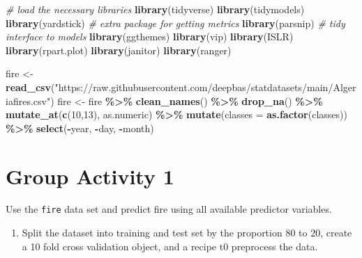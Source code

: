 \documentclass[
]{book}
\newenvironment{Shaded}{\begin{snugshade}}{\end{snugshade}}
\newcommand{\AttributeTok}[1]{\textcolor[rgb]{0.13,0.29,0.53}{#1}}
\newcommand{\CommentTok}[1]{\textcolor[rgb]{0.56,0.35,0.01}{\textit{#1}}}
\newcommand{\DecValTok}[1]{\textcolor[rgb]{0.00,0.00,0.81}{#1}}
\newcommand{\FunctionTok}[1]{\textcolor[rgb]{0.13,0.29,0.53}{\textbf{#1}}}
\newcommand{\NormalTok}[1]{#1}
\newcommand{\OtherTok}[1]{\textcolor[rgb]{0.56,0.35,0.01}{#1}}
\newcommand{\SpecialCharTok}[1]{\textcolor[rgb]{0.81,0.36,0.00}{\textbf{#1}}}
\newcommand{\StringTok}[1]{\textcolor[rgb]{0.31,0.60,0.02}{#1}}
\providecommand{\tightlist}{%
  \setlength{\itemsep}{0pt}\setlength{\parskip}{0pt}}
\begin{document}
\begin{Shaded}
\begin{Highlighting}[]
\CommentTok{\# load the necessary libraries}
\FunctionTok{library}\NormalTok{(tidyverse) }
\FunctionTok{library}\NormalTok{(tidymodels)}
\FunctionTok{library}\NormalTok{(yardstick) }\CommentTok{\# extra package for getting metrics}
\FunctionTok{library}\NormalTok{(parsnip) }\CommentTok{\# tidy interface to models}
\FunctionTok{library}\NormalTok{(ggthemes)}
\FunctionTok{library}\NormalTok{(vip)}
\FunctionTok{library}\NormalTok{(ISLR)}
\FunctionTok{library}\NormalTok{(rpart.plot)}
\FunctionTok{library}\NormalTok{(janitor)}
\FunctionTok{library}\NormalTok{(ranger)}


\NormalTok{fire }\OtherTok{\textless{}{-}} \FunctionTok{read\_csv}\NormalTok{(}\StringTok{"https://raw.githubusercontent.com/deepbas/statdatasets/main/Algeriafires.csv"}\NormalTok{)}
\NormalTok{fire }\OtherTok{\textless{}{-}}\NormalTok{ fire }\SpecialCharTok{\%\textgreater{}\%} \FunctionTok{clean\_names}\NormalTok{() }\SpecialCharTok{\%\textgreater{}\%} 
  \FunctionTok{drop\_na}\NormalTok{() }\SpecialCharTok{\%\textgreater{}\%} 
  \FunctionTok{mutate\_at}\NormalTok{(}\FunctionTok{c}\NormalTok{(}\DecValTok{10}\NormalTok{,}\DecValTok{13}\NormalTok{), as.numeric) }\SpecialCharTok{\%\textgreater{}\%}
  \FunctionTok{mutate}\NormalTok{(}\AttributeTok{classes =} \FunctionTok{as.factor}\NormalTok{(classes)) }\SpecialCharTok{\%\textgreater{}\%}
  \FunctionTok{select}\NormalTok{(}\SpecialCharTok{{-}}\NormalTok{year, }\SpecialCharTok{{-}}\NormalTok{day, }\SpecialCharTok{{-}}\NormalTok{month)}
\end{Highlighting}
\end{Shaded}

\hypertarget{group-activity-1-10}{%
\section{Group Activity 1}\label{group-activity-1-10}}

Use the \texttt{fire} data set and predict fire using all available predictor variables.

\begin{enumerate}
\def\labelenumi{\alph{enumi}.}
\tightlist
\item
  Split the dataset into training and test set by the proportion \(80\) to \(20\), create a 10 fold cross validation object, and a recipe t0 preprocess the data.
\end{enumerate}
\end{document}
